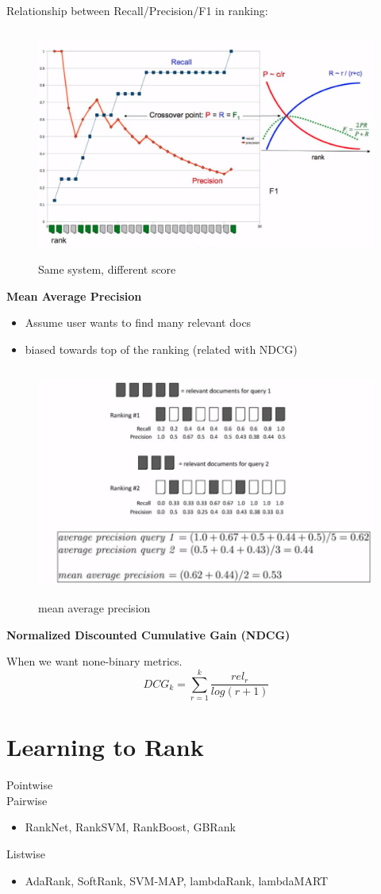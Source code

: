 \documentclass{article}
\begin{document}
Relationship between Recall/Precision/F1 in ranking:
\begin{figure}[H]
\centering
\includegraphics[width=4.5in,height=3in]{rank1}
\caption{Same system, different score}
\end{figure}

\textbf{Mean Average Precision}
\begin{itemize}
\item Assume user wants to find many relevant docs
\item biased towards top of the ranking (related with NDCG)
\end{itemize}
\begin{figure}[H]
\centering
\includegraphics[width=5in,height=3in]{map}
\caption{mean average precision}
\end{figure}

\textbf{Normalized Discounted Cumulative Gain (NDCG)}

When we want none-binary metrics.
$$DCG_{k}=\sum_{r=1}^{k}\frac{rel_{r}}{log(r+1)}$$

\section{Learning to Rank}
\noindent
Pointwise
\\
Pairwise
\begin{itemize}
\item RankNet, RankSVM, RankBoost, GBRank
\end{itemize}
Listwise
\begin{itemize}
\item AdaRank, SoftRank, SVM-MAP, lambdaRank, lambdaMART
\end{itemize}


\end{document}
